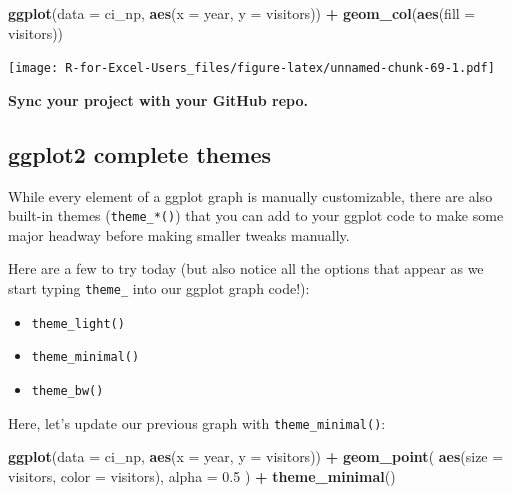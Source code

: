 \documentclass[]{book}
\newenvironment{Shaded}{\begin{snugshade}}{\end{snugshade}}
\newcommand{\DataTypeTok}[1]{\textcolor[rgb]{0.13,0.29,0.53}{#1}}
\newcommand{\FloatTok}[1]{\textcolor[rgb]{0.00,0.00,0.81}{#1}}
\newcommand{\KeywordTok}[1]{\textcolor[rgb]{0.13,0.29,0.53}{\textbf{#1}}}
\newcommand{\NormalTok}[1]{#1}
\newcommand{\OperatorTok}[1]{\textcolor[rgb]{0.81,0.36,0.00}{\textbf{#1}}}
\newcommand{\StringTok}[1]{\textcolor[rgb]{0.31,0.60,0.02}{#1}}
\providecommand{\tightlist}{%
  \setlength{\itemsep}{0pt}\setlength{\parskip}{0pt}}
\begin{document}
\begin{Shaded}
\begin{Highlighting}[]
\KeywordTok{ggplot}\NormalTok{(}\DataTypeTok{data =}\NormalTok{ ci_np, }\KeywordTok{aes}\NormalTok{(}\DataTypeTok{x =}\NormalTok{ year, }\DataTypeTok{y =}\NormalTok{ visitors)) }\OperatorTok{+}
\StringTok{  }\KeywordTok{geom_col}\NormalTok{(}\KeywordTok{aes}\NormalTok{(}\DataTypeTok{fill =}\NormalTok{ visitors))}
\end{Highlighting}
\end{Shaded}

\texttt{[image: R-for-Excel-Users\_files/figure-latex/unnamed-chunk-69-1.pdf]}

\textbf{Sync your project with your GitHub repo.}

\hypertarget{ggplot2-complete-themes}{%
\subsection{ggplot2 complete themes}\label{ggplot2-complete-themes}}

While every element of a ggplot graph is manually customizable, there are also built-in themes (\texttt{theme\_*()}) that you can add to your ggplot code to make some major headway before making smaller tweaks manually.

Here are a few to try today (but also notice all the options that appear as we start typing \texttt{theme\_} into our ggplot graph code!):

\begin{itemize}
\tightlist
\item
  \texttt{theme\_light()}
\item
  \texttt{theme\_minimal()}
\item
  \texttt{theme\_bw()}
\end{itemize}

Here, let's update our previous graph with \texttt{theme\_minimal()}:

\begin{Shaded}
\begin{Highlighting}[]
\KeywordTok{ggplot}\NormalTok{(}\DataTypeTok{data =}\NormalTok{ ci_np, }\KeywordTok{aes}\NormalTok{(}\DataTypeTok{x =}\NormalTok{ year, }\DataTypeTok{y =}\NormalTok{ visitors)) }\OperatorTok{+}
\StringTok{  }\KeywordTok{geom_point}\NormalTok{(}
    \KeywordTok{aes}\NormalTok{(}\DataTypeTok{size =}\NormalTok{ visitors,}
        \DataTypeTok{color =}\NormalTok{ visitors),}
    \DataTypeTok{alpha =} \FloatTok{0.5}
\NormalTok{  ) }\OperatorTok{+}
\StringTok{  }\KeywordTok{theme_minimal}\NormalTok{()}
\end{Highlighting}
\end{Shaded}
\end{document}
